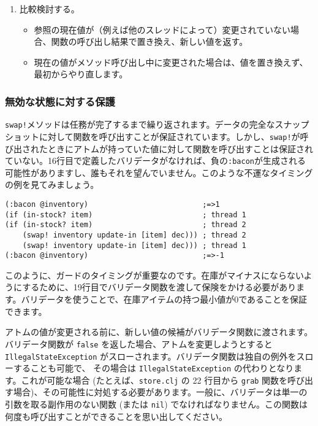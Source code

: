 \begin{enumerate}
\item 比較検討する。

\begin{itemize}
\item 参照の現在値が（例えば他のスレッドによって）変更されていない場合、関数の呼び出し結果で置き換え、新しい値を返す。

\item 現在の値がメソッド呼び出し中に変更された場合は、値を置き換えず、最初からやり直します。
\end{itemize}
\end{enumerate}


\subsubsection{無効な状態に対する保護}

\texttt{swap!}メソッドは任務が完了するまで繰り返されます。データの完全なスナップショットに対して関数を呼び出すことが保証されています。しかし、\texttt{swap!}が呼び出されたときにアトムが持っていた値に対して関数を呼び出すことは保証されていない。16行目で定義したバリデータがなければ、負の\texttt{:bacon}が生成される可能性がありますし、誰もそれを望んでいません。このような不運なタイミングの例を見てみましょう。


\begin{lstlisting}[numbers=none]
(:bacon @inventory)                          ;=>1
(if (in-stock? item)                         ; thread 1
(if (in-stock? item)                         ; thread 2
    (swap! inventory update-in [item] dec))) ; thread 2
    (swap! inventory update-in [item] dec))) ; thread 1
(:bacon @inventory)                          ;=>-1
\end{lstlisting}

このように、ガードのタイミングが重要なのです。在庫がマイナスにならないようにするために、19行目でバリデータ関数を渡して保険をかける必要があります。バリデータを使うことで、在庫アイテムの持つ最小値が0であることを保証できます。

アトムの値が変更される前に、新しい値の候補がバリデータ関数に渡されます。バリデータ関数が \texttt{false} を返した場合、アトムを変更しようとすると \texttt{IllegalStateException} がスローされます。バリデータ関数は独自の例外をスローすることも可能で、 その場合は \texttt{IllegalStateException} の代わりとなります。これが可能な場合 (たとえば、\texttt{store.clj} の 22 行目から \texttt{grab} 関数を呼び出す場合)、その可能性に対処する必要があります。一般に、バリデータは単一の引数を取る副作用のない関数 (または \texttt{nil}) でなければなりません。この関数は何度も呼び出すことができることを思い出してください。

